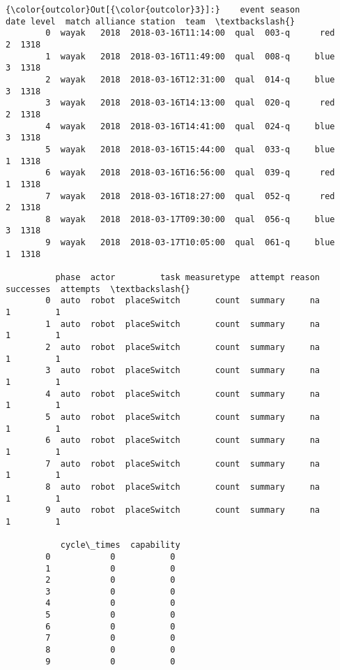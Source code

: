 \documentclass[11pt]{article}
\begin{document}
\begin{Verbatim}[commandchars=\\\{\}]
{\color{outcolor}Out[{\color{outcolor}3}]:}    event season                 date level  match alliance station  team  \textbackslash{}
        0  wayak   2018  2018-03-16T11:14:00  qual  003-q      red       2  1318   
        1  wayak   2018  2018-03-16T11:49:00  qual  008-q     blue       3  1318   
        2  wayak   2018  2018-03-16T12:31:00  qual  014-q     blue       3  1318   
        3  wayak   2018  2018-03-16T14:13:00  qual  020-q      red       2  1318   
        4  wayak   2018  2018-03-16T14:41:00  qual  024-q     blue       3  1318   
        5  wayak   2018  2018-03-16T15:44:00  qual  033-q     blue       1  1318   
        6  wayak   2018  2018-03-16T16:56:00  qual  039-q      red       1  1318   
        7  wayak   2018  2018-03-16T18:27:00  qual  052-q      red       2  1318   
        8  wayak   2018  2018-03-17T09:30:00  qual  056-q     blue       3  1318   
        9  wayak   2018  2018-03-17T10:05:00  qual  061-q     blue       1  1318   
        
          phase  actor         task measuretype  attempt reason  successes  attempts  \textbackslash{}
        0  auto  robot  placeSwitch       count  summary     na          1         1   
        1  auto  robot  placeSwitch       count  summary     na          1         1   
        2  auto  robot  placeSwitch       count  summary     na          1         1   
        3  auto  robot  placeSwitch       count  summary     na          1         1   
        4  auto  robot  placeSwitch       count  summary     na          1         1   
        5  auto  robot  placeSwitch       count  summary     na          1         1   
        6  auto  robot  placeSwitch       count  summary     na          1         1   
        7  auto  robot  placeSwitch       count  summary     na          1         1   
        8  auto  robot  placeSwitch       count  summary     na          1         1   
        9  auto  robot  placeSwitch       count  summary     na          1         1   
        
           cycle\_times  capability  
        0            0           0  
        1            0           0  
        2            0           0  
        3            0           0  
        4            0           0  
        5            0           0  
        6            0           0  
        7            0           0  
        8            0           0  
        9            0           0  
\end{Verbatim}
            
\end{document}
